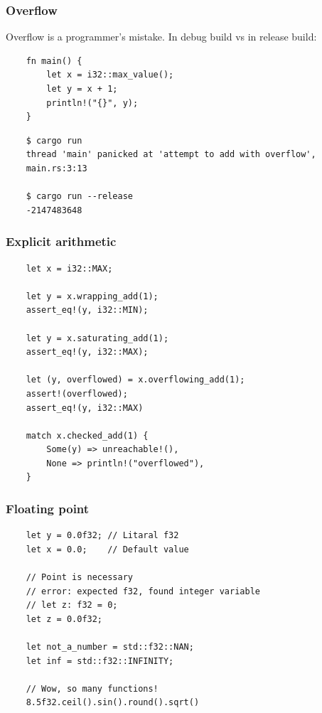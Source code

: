 \documentclass[aspectratio=1610,t]{beamer}
\begin{document}

\begin{frame}[fragile]
\frametitle{Overflow}
Overflow is a programmer's mistake. In debug build vs in release build:

\begin{verbatim}
    fn main() {
        let x = i32::max_value();
        let y = x + 1;
        println!("{}", y);
    }
\end{verbatim}

\begin{verbatim}
    $ cargo run
    thread 'main' panicked at 'attempt to add with overflow',
    main.rs:3:13

    $ cargo run --release
    -2147483648
\end{verbatim}
\end{frame}


\begin{frame}[fragile]
\frametitle{Explicit arithmetic}
\begin{verbatim}
    let x = i32::MAX;

    let y = x.wrapping_add(1);
    assert_eq!(y, i32::MIN);

    let y = x.saturating_add(1);
    assert_eq!(y, i32::MAX);

    let (y, overflowed) = x.overflowing_add(1);
    assert!(overflowed);
    assert_eq!(y, i32::MAX)

    match x.checked_add(1) {
        Some(y) => unreachable!(),
        None => println!("overflowed"),
    }
\end{verbatim}
\end{frame}


\begin{frame}[fragile]
\frametitle{Floating point}
\begin{verbatim}
    let y = 0.0f32; // Litaral f32
    let x = 0.0;    // Default value

    // Point is necessary
    // error: expected f32, found integer variable
    // let z: f32 = 0;
    let z = 0.0f32;

    let not_a_number = std::f32::NAN;
    let inf = std::f32::INFINITY;

    // Wow, so many functions!
    8.5f32.ceil().sin().round().sqrt()
\end{verbatim}
\end{frame}
\end{document}
